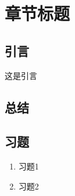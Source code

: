 \specialsectioning
\chapter{章节标题}
\label{chap:intro}

\section{引言}
\renewcommand\specialsectioning{\setcounter{secnumdepth}{2}} %
\specialsectioning
\renewcommand\sectionmark[1]{\markright{\thesection  #1}{}}

这是引言





\section{总结}
\label{xj_ch2}



%
%
%	

\section{习题}

\begin{enumerate}
	\item {习题1}
	\item {习题2}

\end{enumerate}


